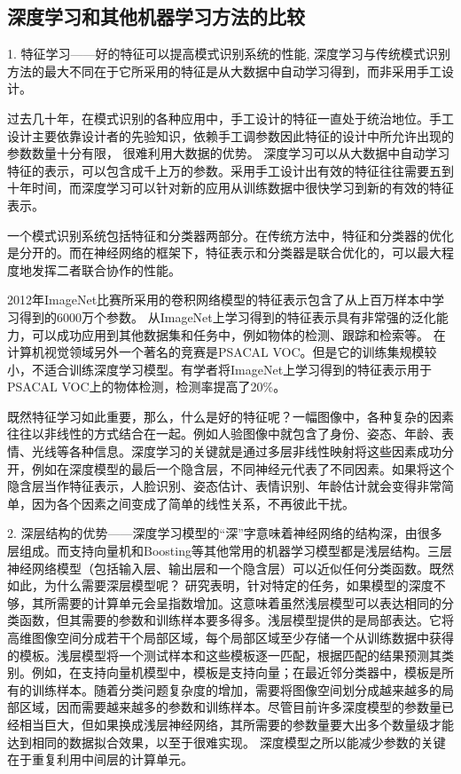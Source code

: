 \subsection{深度学习和其他机器学习方法的比较}

1. 特征学习——好的特征可以提高模式识别系统的性能, 深度学习与传统模式识别方法的最大不同在于它所采用的特征是从大数据中自动学习得到，而非采用手工设计。

过去几十年，在模式识别的各种应用中，手工设计的特征一直处于统治地位。手工设计主要依靠设计者的先验知识，依赖手工调参数因此特征的设计中所允许出现的参数数量十分有限， 很难利用大数据的优势。
深度学习可以从大数据中自动学习特征的表示，可以包含成千上万的参数。采用手工设计出有效的特征往往需要五到十年时间，而深度学习可以针对新的应用从训练数据中很快学习到新的有效的特征表示。

一个模式识别系统包括特征和分类器两部分。在传统方法中，特征和分类器的优化是分开的。而在神经网络的框架下，特征表示和分类器是联合优化的，可以最大程度地发挥二者联合协作的性能。

\begin{example}
2012年ImageNet比赛所采用的卷积网络模型的特征表示包含了从上百万样本中学习得到的6000万个参数。
从ImageNet上学习得到的特征表示具有非常强的泛化能力，可以成功应用到其他数据集和任务中，例如物体的检测、跟踪和检索等。
在计算机视觉领域另外一个著名的竞赛是PSACAL VOC。但是它的训练集规模较小，不适合训练深度学习模型。有学者将ImageNet上学习得到的特征表示用于 PSACAL VOC上的物体检测，检测率提高了20\%。
\end{example}

既然特征学习如此重要，那么，什么是好的特征呢？一幅图像中，各种复杂的因素往往以非线性的方式结合在一起。例如人验图像中就包含了身份、姿态、年龄、表情、光线等各种信息。深度学习的关键就是通过多层非线性映射将这些因素成功分开，例如在深度模型的最后一个隐含层，不同神经元代表了不同因素。如果将这个隐含层当作特征表示，人脸识别、姿态估计、表情识别、年龄估计就会变得非常简单，因为各个因素之间变成了简单的线性关系，不再彼此干扰。

2. 深层结构的优势——深度学习模型的“深”字意味着神经网络的结构深，由很多层组成。而支持向量机和Boosting等其他常用的机器学习模型都是浅层结构。三层神经网络模型（包括输入层、输出层和一个隐含层）可以近似任何分类函数。既然如此，为什么需要深层模型呢？
研究表明，针对特定的任务，如果模型的深度不够，其所需要的计算单元会呈指数增加。这意味着虽然浅层模型可以表达相同的分类函数，但其需要的参数和训练样本要多得多。浅层模型提供的是局部表达。它将高维图像空间分成若干个局部区域，每个局部区域至少存储一个从训练数据中获得的模板。浅层模型将一个测试样本和这些模板逐一匹配，根据匹配的结果预测其类别。例如，在支持向量机模型中，模板是支持向量；在最近邻分类器中，模板是所有的训练样本。随着分类问题复杂度的增加，需要将图像空间划分成越来越多的局部区域，因而需要越来越多的参数和训练样本。尽管目前许多深度模型的参数量已经相当巨大，但如果换成浅层神经网络，其所需要的参数量要大出多个数量级才能达到相同的数据拟合效果，以至于很难实现。
深度模型之所以能减少参数的关键在于重复利用中间层的计算单元。

